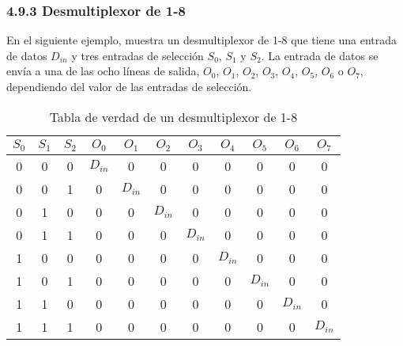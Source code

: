 \subsubsection*{4.9.3 Desmultiplexor de 1-8}
En el siguiente ejemplo, muestra un desmultiplexor de 1-8 que tiene una entrada de datos $D_{in}$ y tres entradas de selecci\'{o}n $S_0$, $S_1$ y $S_2$.
La entrada de datos se env\'{i}a a una de las ocho l\'{i}neas de salida, $O_0$, $O_1$, $O_2$, $O_3$, $O_4$, $O_5$, $O_6$ o $O_7$, dependiendo del valor de las entradas de selecci\'{o}n.

\begin{table}[h]
    \centering
    \begin{tabular}{ccc|cccccccc}
        \toprule
        $S_0$ & $S_1$ & $S_2$ & $O_0$    & $O_1$    & $O_2$    & $O_3$    & $O_4$    & $O_5$    & $O_6$    & $O_7$    \\
        \midrule
        0     & 0     & 0     & $D_{in}$ & 0        & 0        & 0        & 0        & 0        & 0        & 0        \\
        0     & 0     & 1     & 0        & $D_{in}$ & 0        & 0        & 0        & 0        & 0        & 0        \\
        0     & 1     & 0     & 0        & 0        & $D_{in}$ & 0        & 0        & 0        & 0        & 0        \\
        0     & 1     & 1     & 0        & 0        & 0        & $D_{in}$ & 0        & 0        & 0        & 0        \\
        1     & 0     & 0     & 0        & 0        & 0        & 0        & $D_{in}$ & 0        & 0        & 0        \\
        1     & 0     & 1     & 0        & 0        & 0        & 0        & 0        & $D_{in}$ & 0        & 0        \\
        1     & 1     & 0     & 0        & 0        & 0        & 0        & 0        & 0        & $D_{in}$ & 0        \\
        1     & 1     & 1     & 0        & 0        & 0        & 0        & 0        & 0        & 0        & $D_{in}$ \\
        \bottomrule
    \end{tabular}
    \caption{Tabla de verdad de un desmultiplexor de 1-8}
\end{table}
